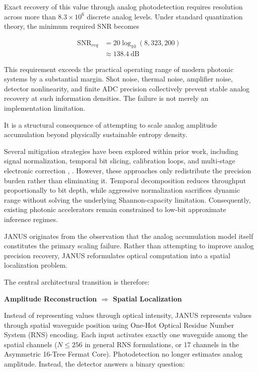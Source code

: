 \documentclass[journal]{IEEEtran}
\begin{document}
Exact recovery of this value through analog photodetection requires resolution across more than $8.3 \times 10^{6}$ discrete analog levels. Under standard quantization theory, the minimum required SNR becomes \cite{Winzer2006,Saleh2019}

\begin{align}
\mathrm{SNR}_{req} &= 20\log_{10}\left( 8{,}323{,}200 \right) \\
&\approx 138.4~\mathrm{dB} \label{eq:snr_requirement}
\end{align}

This requirement exceeds the practical operating range of modern photonic systems by a substantial margin. Shot noise, thermal noise, amplifier noise, detector nonlinearity, and finite ADC precision collectively prevent stable analog recovery at such information densities.
The failure is not merely an implementation limitation.

It is a structural consequence of attempting to scale analog amplitude accumulation beyond physically sustainable entropy density.

Several mitigation strategies have been explored within prior work, including signal normalization, temporal bit slicing, calibration loops, and multi-stage electronic correction \cite{Hamerly2022}, \cite{Cauwenberghs2013}. However, these approaches only redistribute the precision
burden rather than eliminating it. Temporal decomposition reduces throughput proportionally to bit depth, while aggressive normalization sacrifices dynamic range without solving the underlying Shannon-capacity limitation. Consequently, existing photonic accelerators remain constrained to low-bit approximate inference regimes.

JANUS originates from the observation that the analog accumulation model itself constitutes the primary scaling failure. Rather than attempting to improve analog precision recovery, JANUS reformulates optical computation into a spatial localization problem.

The central architectural transition is therefore: 

\textbf{Amplitude Reconstruction $\Longrightarrow$ Spatial Localization}

Instead of representing values through optical intensity, JANUS represents values through spatial waveguide position using One-Hot Optical Residue Number System (RNS) encoding. Each input activates exactly one waveguide among the spatial channels ($N \le 256$ in general RNS formulations, or 17 channels in the Asymmetric 16-Tree Fermat Core). Photodetection no longer estimates analog amplitude. Instead, the detector answers a binary question:
\end{document}
